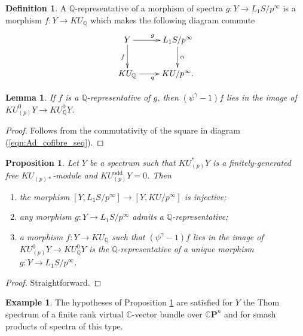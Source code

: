 \documentclass[10pt,a4paper]{amsart}
\newtheorem{prop}[thm]{Proposition}
\newtheorem{lem}[thm]{Lemma}
\theoremstyle{definition}
\newtheorem{defn}[thm]{Definition}
\newtheorem{exam}[thm]{Example}
\theoremstyle{remark}
\newcommand{\cx}{\mathbb{C}}
\newcommand{\rat}{\mathbb{Q}}
\begin{document}
\begin{defn}
	A $\rat$-representative of a morphism of spectra $g : Y \rightarrow L_1 S /p^\infty$ is a morphism $f : Y \rightarrow KU_\rat$ which makes the following diagram commute
	\begin{eqnarray}
\label{eqn:KU-commutative-ad}
 \xymatrix{
Y
\ar[r]^g
\ar[d]_f
&
L_1 S /p^\infty
\ar[d]^\alpha
\\
KU_\rat
\ar[r]_q
&
KU/p^\infty.
}
\end{eqnarray}
\end{defn}

\begin{lem}
	If $f$ is a $\rat$-representative of $g$, then $(\psi^\gamma -1) f$ lies in the image of $KU^0_{(p)}Y
\rightarrow KU^0_\rat Y$.
\end{lem}

\begin{proof}
	Follows from the commutativity of the square in diagram (\ref{eqn:Ad_cofibre_seq}).
\end{proof}



\begin{prop}
\label{prop:represent-ad}
Let $Y$ be a spectrum such that $KU ^*_{(p)} Y$ is a finitely-generated free $KU_{(p)*}$-module  and
$KU^{\mathrm{odd}}_{(p)}Y=0$. Then
\begin{enumerate}
	\item
	the morphism $[Y, L_1 S /p^\infty ] \rightarrow [Y, KU/p^\infty]$ is injective;
	\item
	any morphism $g : Y \rightarrow L_1 S /p^\infty$ admits a $\rat$-representative;
\item
a morphism $f: Y \rightarrow KU_\rat$ such that $(\psi^\gamma -1) f$ lies in the image of $KU^0_{(p)}Y \rightarrow
KU^0_\rat Y$ is the $\rat$-representative of a unique morphism $g : Y \rightarrow L_1 S/p^\infty$.
\end{enumerate}
\end{prop}

\begin{proof}
	Straightforward.
\end{proof}

\begin{exam}
	The hypotheses of Proposition \ref{prop:represent-ad} are satisfied for  $Y$ the Thom spectrum of  a finite rank virtual $\cx$-vector bundle over $\mathbb{C}\mathbf{P}^n$ and for smash products of spectra of this type.
\end{exam}
\end{document}
